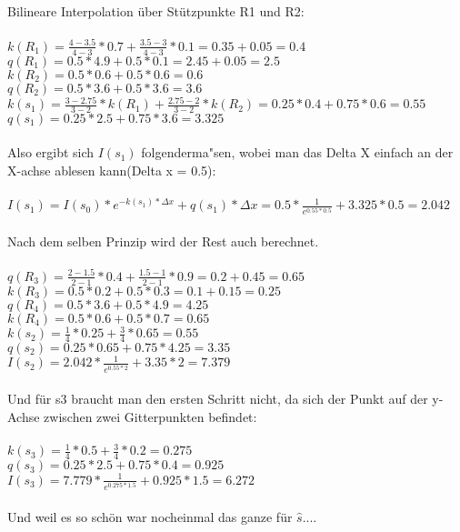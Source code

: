 Bilineare Interpolation über Stützpunkte R1 und R2:\\
\\
$k(R_1) = \frac{4-3.5}{4-3} * 0.7 + \frac{3.5-3}{4-3} * 0.1 = 0.35 + 0.05 = 0.4$\\
$q(R_1) = 0.5 * 4.9 + 0.5 * 0.1 = 2.45 + 0.05 = 2.5$\\
$k(R_2) = 0.5 * 0.6 + 0.5 * 0.6 = 0.6$\\
$q(R_2) = 0.5 * 3.6 + 0.5 * 3.6 = 3.6$\\
$k(s_1) = \frac{3-2.75}{3-2} * k(R_1) + \frac{2.75 - 2}{3-2} * k(R_2) = 0.25 * 0.4 + 0.75 * 0.6 = 0.55$\\
$q(s_1) = 0.25 * 2.5 + 0.75 * 3.6 = 3.325$\\
\\
Also ergibt sich $I(s_{1})$ folgenderma"sen, wobei man das Delta X einfach an der X-achse ablesen kann(Delta x = 0.5):\\
\\
$I(s_1) = I(s_0) * e^{-k(s_1)*\Delta x} + q(s_1)*\Delta x = 0.5 * \frac{1}{e^{0.55*0.5}} + 3.325 * 0.5 = 2.042$\\
\\
Nach dem selben Prinzip wird der Rest auch berechnet.\\
\\
$q(R_3) = \frac{2-1.5}{2-1} * 0.4 + \frac{1.5-1}{2-1} * 0.9 = 0.2 + 0.45 = 0.65$\\
$k(R_3) = 0.5 * 0.2 + 0.5 * 0.3 = 0.1 + 0.15 = 0.25$\\
$q(R_4) = 0.5 * 3.6 + 0.5 * 4.9 = 4.25$\\
$k(R_4) = 0.5 * 0.6 + 0.5 * 0.7 = 0.65$\\
$k(s_2) = \frac{1}{4} * 0.25 + \frac{3}{4} * 0.65 = 0.55$\\
$q(s_2) = 0.25 * 0.65 + 0.75 * 4.25 = 3.35$\\
$I(s_2) = 2.042 * \frac{1}{e^{0.55*2}} + 3.35 * 2 = 7.379$\\
\\
Und für s3 braucht man den ersten Schritt nicht, da sich der Punkt auf der y-Achse zwischen zwei Gitterpunkten befindet:\\
\\
$k(s_3) = \frac{1}{4} * 0.5 + \frac{3}{4} * 0.2 = 0.275$\\
$q(s_3) = 0.25 * 2.5 + 0.75 * 0.4 = 0.925$\\
$I(s_3) = 7.779 * \frac{1}{e^{0.275*1.5}} + 0.925 * 1.5 = 6.272$\\
\\
Und weil es so schön war nocheinmal das ganze für $\hat{s}$....\\
